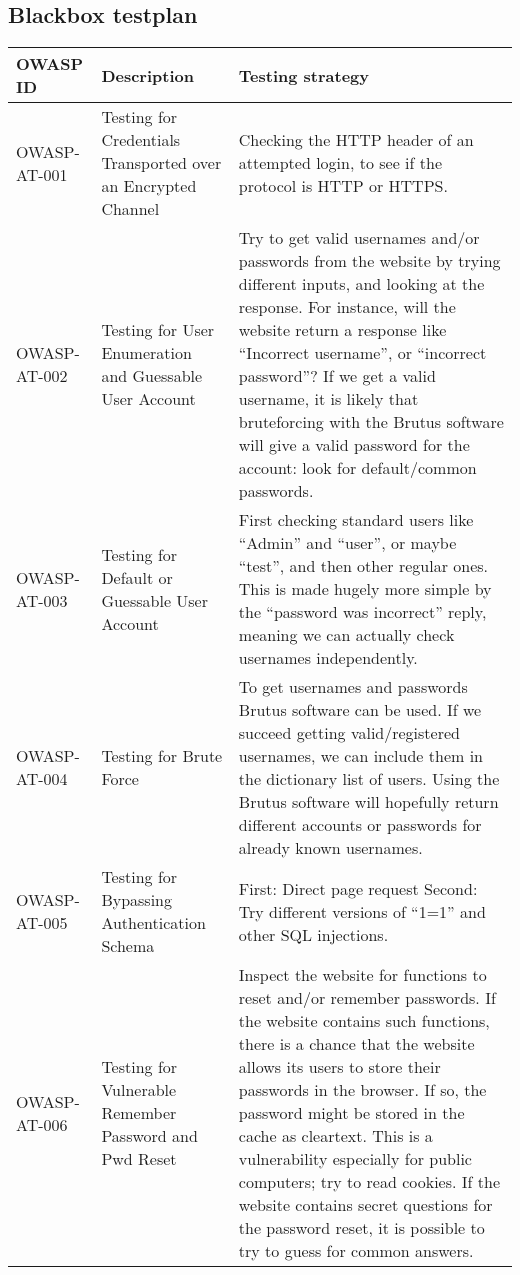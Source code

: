 \newpage 

\subsection{Blackbox testplan}

\addtolength{\oddsidemargin}{-.5in}

\begin{longtable}{| l | p{4.5cm} | p{7.5cm} |}
	\hline
	{\bf OWASP ID} & {\bf Description} & {\bf Testing strategy} \\ \hline
	
	OWASP-AT-001 & Testing for Credentials Transported over an Encrypted Channel & Checking the HTTP header of an attempted login, to see if the protocol is HTTP or HTTPS. \\ \hline
	
	OWASP-AT-002 & Testing for User Enumeration and Guessable User Account & Try to get valid usernames and/or passwords from the website by trying different inputs, and looking at the response. For instance, will the website return a response like “Incorrect username”, or “incorrect password”? If we get a valid username, it is likely that bruteforcing with the Brutus software will give a valid password for the account: look for default/common passwords.\\ \hline
	
	OWASP-AT-003 & Testing for Default or Guessable User Account & 
First checking standard users like “Admin” and “user”, or maybe “test”, and then other regular ones. This is made hugely more simple by the “password was incorrect” reply, meaning we can actually check usernames independently.
\\ \hline

	OWASP-AT-004 & Testing for Brute Force
 & 
To get usernames and passwords Brutus software can be used. If we succeed getting valid/registered usernames, we can include them in the dictionary list of users. Using the Brutus software will hopefully return different accounts or passwords for already known usernames.
 \\ \hline

	OWASP-AT-005 & 
Testing for Bypassing Authentication Schema
& 
First: Direct page request
Second: Try different versions of “1=1” and other SQL injections.
\\ \hline

	OWASP-AT-006 & Testing for Vulnerable Remember Password and Pwd Reset
 &  
Inspect the website for functions to reset and/or remember passwords. If the website contains such functions, there is a chance that the website allows its users to store their passwords in the browser. If so, the password might be stored in the cache as cleartext. This is a vulnerability especially for public computers; try to read cookies. If the website contains secret questions for the password reset, it is possible to try to guess for common answers.
\\ \hline


\end{longtable}
